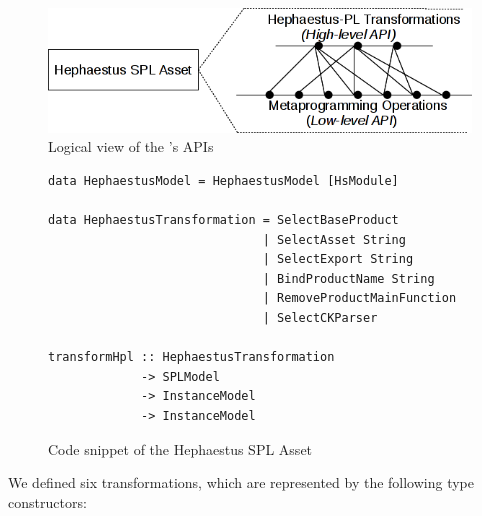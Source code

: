 
\begin{center}
\begin{figure}[htb]
\includegraphics[scale=0.7]{imagens/apis-hpl-asset.png}
\caption{Logical view of the \hpl's APIs}
\label{fig:apis-hpl-asset}
\end{figure}
\end{center}



\begin{figure}
\begin{lstlisting}
data HephaestusModel = HephaestusModel [HsModule]

data HephaestusTransformation = SelectBaseProduct
                              | SelectAsset String
                              | SelectExport String
                              | BindProductName String
                              | RemoveProductMainFunction
                              | SelectCKParser

transformHpl :: HephaestusTransformation
             -> SPLModel
             -> InstanceModel
             -> InstanceModel
\end{lstlisting}
\caption{Code snippet of the Hephaestus SPL Asset}
\label{fig:code-hp-spl-asset}
\end{figure}


We defined six \hpl{} transformations, which are represented by the following type constructors:

